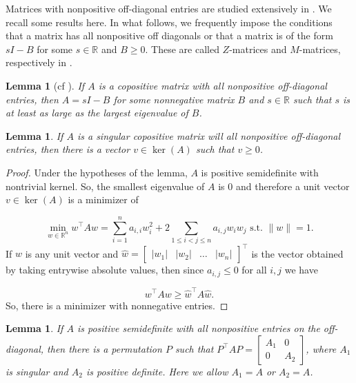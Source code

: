 \documentclass{amsart}
\newcommand{\bbR}{\mathbb{R}}
\newtheorem{lemma}[theorem]{Lemma}
\theoremstyle{definition}
\begin{document}
Matrices with nonpositive off-diagonal entries are studied extensively in \cite{berman_6_1994}. We recall some results here. In what follows, we frequently impose the conditions that a matrix has all nonpositive off diagonals or that a matrix is of the form $sI - B$ for some $s\in \bbR$ and $B \geq 0$. These are called $Z$-matrices and $M$-matrices, respectively in \cite{berman_6_1994,shaked-monderer_spn_2016}.

\begin{lemma}[{cf \cite[Lemma 2.8]{shaked-monderer_spn_2016}}]
If $A$ is a copositive matrix with all nonpositive off-diagonal entries, then $A = sI - B$ for some nonnegative matrix $B$ and $s \in \bbR$ such that $s$ is at least as large as the largest eigenvalue of $B$. 
\end{lemma}

\begin{lemma}\label{lem:SingularCopositiveNonnegativeKernel}
If $A$ is a singular copositive matrix will all nonpositive off-diagonal entries, then there is a vector $v \in \ker(A)$ such that $v \geq 0$.
\end{lemma}

\begin{proof}
Under the hypotheses of the lemma, $A$ is positive semidefinite with nontrivial kernel. So, the smallest eigenvalue of $A$ is 0 and therefore a unit vector $v \in \ker(A)$ is a minimizer of 

\[\min_{w\in \bbR^n} w^\top A w = \sum_{i = 1}^{n} a_{i,i}w_i^2 + 2\sum_{1\leq i < j \leq n}a_{i,j}w_iw_j \text{ s.t. } \|w\| = 1.\]
%
If $w$ is any unit vector and $\hat{w} = \begin{bmatrix} |w_1| & |w_2| & \ldots & |w_n|\end{bmatrix}^\top$ is the vector obtained by taking entrywise absolute values, then since $a_{i,j}\leq 0$ for all $i,j$ we have 

\[w^\top A w \geq \hat{w}^\top A \hat{w}.\]
%
So, there is a minimizer with nonnegative entries. 
\end{proof}

\begin{lemma}\label{lem:PSDSingularBlocks}
If $A$ is positive semidefinite with all nonpositive entries on the off-diagonal, then there is a permutation $P$ such that $P^\top A P = \begin{bmatrix} A_1 &0 \\ 0 & A_2\end{bmatrix}$, where $A_1$ is singular and $A_2$ is positive definite. Here we allow $A_1 = A$ or $A_2 = A$. 
\end{lemma}
\end{document}
